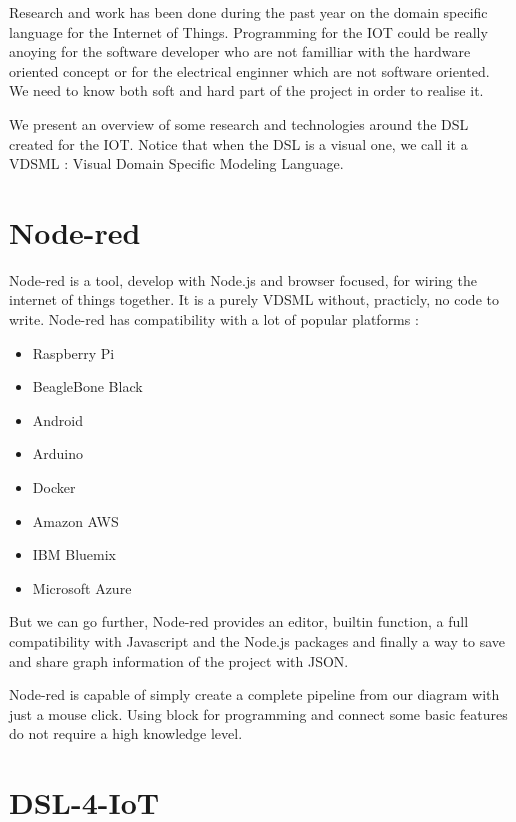 \label{cha:dsl-for-iot}

Research and work has been done during the past year on the domain specific
language for the Internet of Things. Programming for the IOT could be really
anoying for the software developer who are not familliar with the hardware oriented
concept or for the electrical enginner which are not software oriented. We need
to know both soft and hard part of the project in order to realise it.

We present an overview of some research and technologies around the DSL created
for the IOT. Notice that when the DSL is a visual one, we call it a VDSML :
Visual Domain Specific Modeling Language.

\section{Node-red}
\label{sec:node-red}

Node-red\cite{node-red} is a tool, develop with Node.js and browser focused, for
wiring the internet of things together. It is a purely VDSML without, practicly,
no code to write. Node-red has compatibility with a lot of popular platforms\cite{node-red} :
\begin{itemize}
\item Raspberry Pi
\item BeagleBone Black
\item Android
\item Arduino
\item Docker
\item Amazon AWS
\item IBM Bluemix
\item Microsoft Azure
\end{itemize}

But we can go further, Node-red provides an editor, builtin function, a full
compatibility with Javascript and the Node.js packages and finally a way to save
and share graph information of the project with JSON.

Node-red is capable of simply create a complete pipeline from our diagram with
just a mouse click. Using block for programming and connect some basic features
do not require a high knowledge level.

\section{DSL-4-IoT}
\label{sec:dsl-4-iot}


